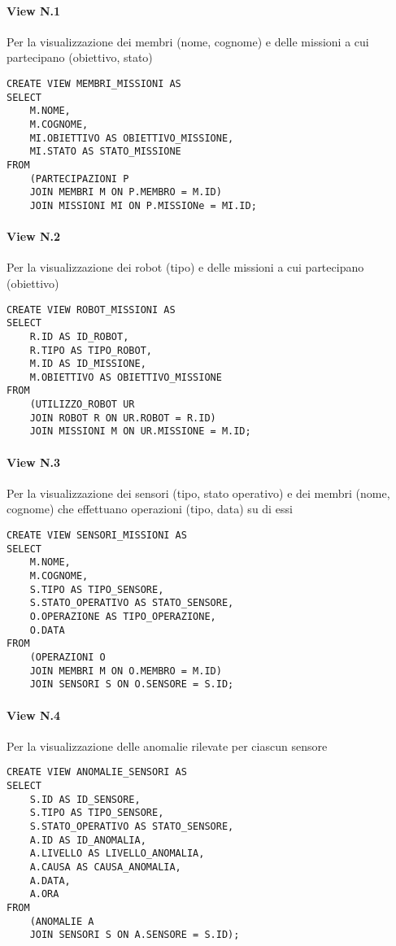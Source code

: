 \paragraph{View N.1}Per la visualizzazione dei membri (nome, cognome) e delle missioni a cui partecipano (obiettivo, stato)
\begin{lstlisting}
CREATE VIEW MEMBRI_MISSIONI AS
SELECT 
    M.NOME, 
    M.COGNOME, 
    MI.OBIETTIVO AS OBIETTIVO_MISSIONE, 
    MI.STATO AS STATO_MISSIONE
FROM 
    (PARTECIPAZIONI P 
    JOIN MEMBRI M ON P.MEMBRO = M.ID) 
    JOIN MISSIONI MI ON P.MISSIONe = MI.ID;
\end{lstlisting}

\paragraph{View N.2} Per la visualizzazione dei robot (tipo) e delle missioni a cui partecipano (obiettivo)
\begin{lstlisting}
CREATE VIEW ROBOT_MISSIONI AS
SELECT 
    R.ID AS ID_ROBOT, 
    R.TIPO AS TIPO_ROBOT, 
    M.ID AS ID_MISSIONE, 
    M.OBIETTIVO AS OBIETTIVO_MISSIONE
FROM 
    (UTILIZZO_ROBOT UR 
    JOIN ROBOT R ON UR.ROBOT = R.ID) 
    JOIN MISSIONI M ON UR.MISSIONE = M.ID;
\end{lstlisting}

\paragraph{View N.3} Per la visualizzazione dei sensori (tipo, stato operativo) e dei membri (nome, cognome) che effettuano operazioni (tipo, data) su di essi
\begin{lstlisting}
CREATE VIEW SENSORI_MISSIONI AS
SELECT
    M.NOME,
    M.COGNOME,
    S.TIPO AS TIPO_SENSORE,
    S.STATO_OPERATIVO AS STATO_SENSORE,
    O.OPERAZIONE AS TIPO_OPERAZIONE,
    O.DATA
FROM 
    (OPERAZIONI O
    JOIN MEMBRI M ON O.MEMBRO = M.ID)
	JOIN SENSORI S ON O.SENSORE = S.ID;
\end{lstlisting}

\paragraph{View N.4} Per la visualizzazione delle anomalie rilevate per ciascun sensore
\begin{lstlisting}
CREATE VIEW ANOMALIE_SENSORI AS
SELECT
    S.ID AS ID_SENSORE,
    S.TIPO AS TIPO_SENSORE,
    S.STATO_OPERATIVO AS STATO_SENSORE,
    A.ID AS ID_ANOMALIA,
    A.LIVELLO AS LIVELLO_ANOMALIA,
    A.CAUSA AS CAUSA_ANOMALIA,
    A.DATA,
    A.ORA
FROM 
    (ANOMALIE A
    JOIN SENSORI S ON A.SENSORE = S.ID);
\end{lstlisting}

